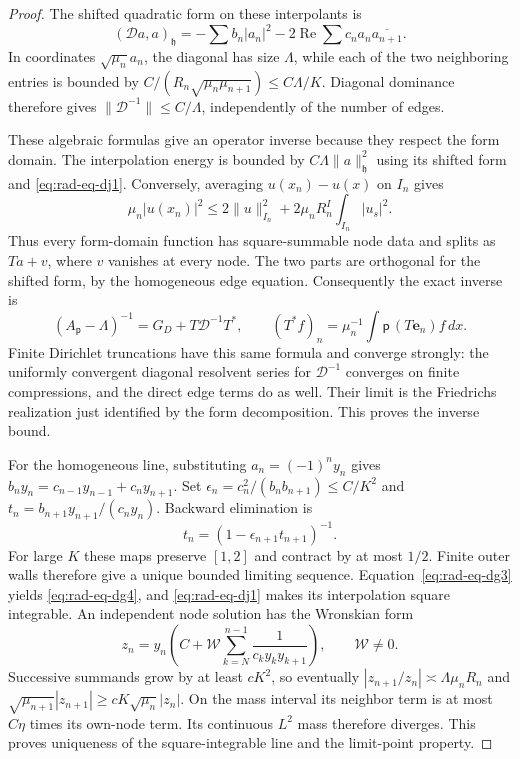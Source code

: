 \begin{proof}
The shifted quadratic form on these interpolants is
\[
 (\mathcal Da,a)_{\mathfrak h}
   =-\sum b_n|a_n|^2-2\operatorname{Re}\sum c_na_n\overline{a_{n+1}}.
\]
In coordinates $\sqrt{\mu_n}a_n$, the diagonal has size $\Lambda$,
while each of the two neighboring entries is bounded by
$C/(R_n\sqrt{\mu_n\mu_{n+1}})\le C\Lambda/K$.
Diagonal dominance therefore gives
$\|\mathcal D^{-1}\|\le C/\Lambda$, independently of the number
of edges.

These algebraic formulas give an operator inverse because they respect
the form domain.  The interpolation energy is bounded by
$C\Lambda\|a\|_{\mathfrak h}^2$ using its shifted form and
\eqref{eq:rad-eq-dj1}.  Conversely, averaging $u(x_n)-u(x)$ on
$I_n$ gives
\[
 \mu_n|u(x_n)|^2\le2\|u\|_{I_n}^2+
             2\mu_nR_n^I\int_{I_n}|u_s|^2.
\]
Thus every form-domain function has square-summable node data and
splits as $Ta+v$, where $v$ vanishes at every node.  The two parts
are orthogonal for the shifted form, by the homogeneous edge equation.
Consequently the exact inverse is
\begin{equation}\label{eq:rad-eq-dj2}
 (A_{\mathsf p}-\Lambda)^{-1}=G_D+T\mathcal D^{-1}T^*,
 \qquad (T^*f)_n=\mu_n^{-1}\int\mathsf p\,(T\mathbf e_n)f\,dx.
\end{equation}
Finite Dirichlet truncations have this same formula and converge
strongly: the uniformly convergent diagonal resolvent series for
$\mathcal D^{-1}$ converges on finite compressions, and the direct edge
terms do as well.  Their limit is the Friedrichs realization just
identified by the form decomposition.  This proves the inverse bound.

For the homogeneous line, substituting $a_n=(-1)^ny_n$ gives
$b_ny_n=c_{n-1}y_{n-1}+c_ny_{n+1}$.
Set $\epsilon_n=c_n^2/(b_nb_{n+1})\le C/K^2$ and
$t_n=b_{n+1}y_{n+1}/(c_ny_n)$.  Backward elimination is
\[
 t_n=(1-\epsilon_{n+1}t_{n+1})^{-1}.
\]
For large $K$ these maps preserve $[1,2]$ and contract by at most
$1/2$.  Finite outer walls therefore give a unique bounded limiting
sequence.  Equation~\eqref{eq:rad-eq-dg3} yields
\eqref{eq:rad-eq-dg4}, and \eqref{eq:rad-eq-dj1} makes its
interpolation square integrable.
An independent node solution has the Wronskian form
\[
 z_n=y_n\left(C+\mathcal W\sum_{k=N}^{n-1}
                \frac1{c_ky_ky_{k+1}}\right),\qquad\mathcal W\ne0.
\]
Successive summands grow by at least $cK^2$, so eventually
$|z_{n+1}/z_n|\asymp\Lambda\mu_nR_n$ and
$\sqrt{\mu_{n+1}}|z_{n+1}|\ge cK\sqrt{\mu_n}|z_n|$.
On the mass interval its neighbor term is at most $C\eta$ times its
own-node term.  Its continuous $L^2$ mass therefore diverges.
This proves uniqueness of the square-integrable line and the
limit-point property.


\end{proof}

